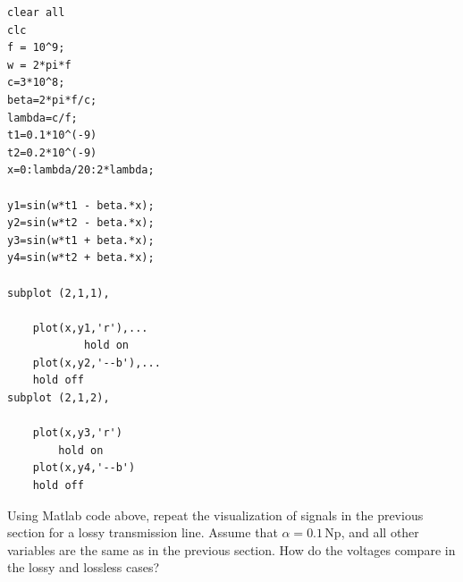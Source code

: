 \documentclass{ximera}
\begin{document}
\begin{example}
\begin{verbatim}
clear all
clc
f = 10^9;
w = 2*pi*f
c=3*10^8;
beta=2*pi*f/c;
lambda=c/f;
t1=0.1*10^(-9)
t2=0.2*10^(-9)
x=0:lambda/20:2*lambda;

y1=sin(w*t1 - beta.*x);
y2=sin(w*t2 - beta.*x);
y3=sin(w*t1 + beta.*x);
y4=sin(w*t2 + beta.*x);

subplot (2,1,1),

    plot(x,y1,'r'),...
            hold on
    plot(x,y2,'--b'),...
    hold off
subplot (2,1,2),

    plot(x,y3,'r')
        hold on
    plot(x,y4,'--b')
    hold off
\end{verbatim}

Using Matlab code above, repeat the visualization of signals in the previous section for a lossy transmission line. Assume that $\alpha=0.1$\,Np, and all other variables are the same as in the previous section. How do the voltages compare in the lossy and lossless cases?

\end{example}
\end{document}
